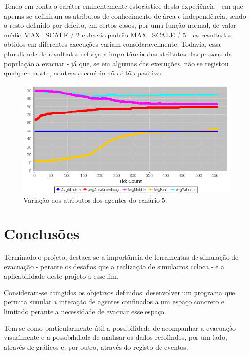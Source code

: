 \documentclass[12pt]{article}
\begin{document}
\begin{titlepage}
\begin{itemize}
Tendo em conta o caráter eminentemente estocástico desta experiência - em que apenas se definiram os atributos de conhecimento de área e independência, sendo o resto definido por defeito, em certos casos, por uma função normal, de valor médio MAX\_SCALE / 2 e desvio padrão MAX\_SCALE / 5 - os resultados obtidos em diferentes execuções variam consideravelmente.
Todavia, essa pluralidade de resultados reforça a importância dos atributos das pessoas da população a evacuar - já que, se em algumas das execuções, não se registou qualquer morte, noutras o cenário não é tão positivo.

\begin{figure}[H]
	\centering
	\includegraphics{graph_sc5_1.png}
	\caption{Variação dos atributos dos agentes do cenário 5.}
	\label{graph_sc5}
\end{figure}

\end{itemize}
	
	

\newpage
\section{Conclusões}

Terminado o projeto, destaca-se a importância de ferramentas de simulação de evacuação - perante os desafios que a realização de simulacros coloca - e a aplicabilidade deste projeto a esse fim.

Consideram-se atingidos os objetivos definidos: desenvolver um programa que permita simular a interação de agentes confinados a um espaço concreto e limitado perante a necessidade de evacuar esse espaço.

Tem-se como particularmente útil a possibilidade de acompanhar a evacuação visualmente e a possibilidade de analisar os dados recolhidos, por um lado, através de gráficos e, por outro, através do registo de eventos.


\end{titlepage}
\end{document}
